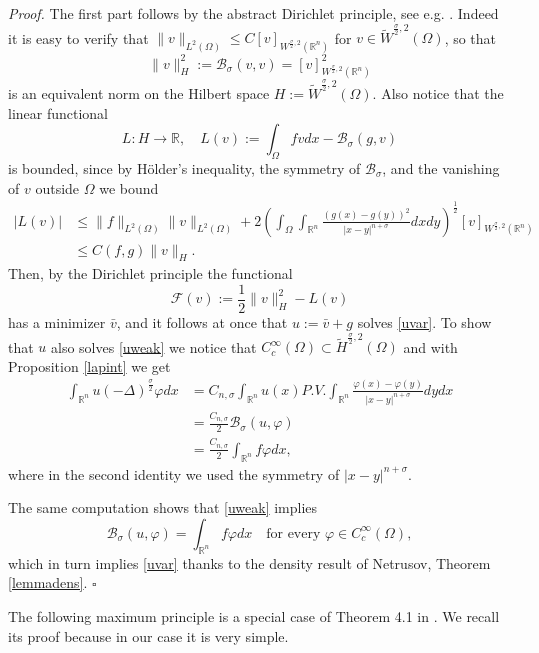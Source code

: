 \documentclass[11pt, a4paper]{article}
\newcommand{\R}{\mathbb{R}}
\newcommand{\M}[1]{\mathcal{#1}}
\newenvironment{proof}{\noindent\emph{Proof.}}{\phantom{ } \hfill$\square$\medskip}
\begin{document}
\begin{proof} The first part follows by the abstract Dirichlet principle, see e.g. \cite[Theorem 3.2]{GM}. Indeed it is easy to verify that $\|v\|_{L^2(\Omega)}\le C[v]_{W^{\frac\sigma2,2}(\R^n)}$ for $v\in \tilde W^{\frac\sigma2,2}(\Omega)$, so that 
$$\|v\|_{H}^2:=\M{B}_\sigma(v,v)=[v]_{W^{\frac\sigma2,2}(\R^n)}^2$$
is an equivalent norm on the Hilbert space $H:=\tilde W^{\frac\sigma2,2}(\Omega)$. Also notice that the linear functional
$$L:H\to\R,\quad 
L(v):=\int_{\Omega}fvdx-\M{B}_\sigma(g,v)$$
is bounded, since by H\"older's inequality, the symmetry of $\mathcal{B}_\sigma$, and the vanishing of $v$ outside $\Omega$ we bound
\[
\begin{split}
|L(v)|&\le \|f\|_{L^2(\Omega)}\|v\|_{L^2(\Omega)} + 2\left(\int_\Omega\int_{\R^n}\frac{(g(x)-g(y))^2}{|x-y|^{n+\sigma}}dxdy\right)^\frac{1}{2}[v]_{W^{\frac\sigma2,2}(\R^n)}\\
&\le C(f,g)\|v\|_{H}.
\end{split}
\]
Then, by the Dirichlet principle the functional
$$\M{F}(v):=\frac{1}{2}\|v\|_H^2-L(v)$$
has a minimizer $\bar v$, and it follows at once that $u:=\bar v+g$ solves \eqref{uvar}.
To show that $u$ also solves \eqref{uweak} we notice that $C^\infty_c(\Omega)\subset \tilde H^{\frac\sigma2,2}(\Omega)$ and with Proposition \ref{lapint} we get
\[\begin{split}
\int_{\R^n} u(-\Delta)^\frac\sigma2 \varphi dx &=C_{n,\sigma}\int_{\R^n} u(x) P.V.\int_{\R^n}\frac{\varphi(x)-\varphi(y)}{|x-y|^{n+\sigma}}dydx\\
&=\frac{C_{n,\sigma}}{2}\M{B}_\sigma(u,\varphi)\\
&= \frac{C_{n,\sigma}}{2}\int_{\R^n} f\varphi dx,
\end{split}\]
where in the second identity we used the symmetry of $|x-y|^{n+\sigma}$.

The same computation shows that \eqref{uweak} implies
$$\M{B}_\sigma(u,\varphi)=\int_{\R^n} f\varphi dx\quad \text{for every }\varphi\in C^\infty_c(\Omega),$$
which in turn implies \eqref{uvar} thanks to the density result of Netrusov, Theorem \ref{lemmadens}.
\end{proof}


The following maximum principle is a special case of Theorem 4.1 in \cite{FKV}. We recall its proof because in our case it is very simple. %
\end{document}
